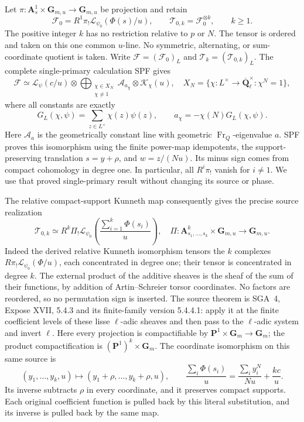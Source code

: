 Let \(\pi:\mathbf A^1_s\times\mathbf G_{m,u}\to\mathbf
G_{m,u}\) be projection and retain
\[
 \mathcal F_0=R^1\pi_!\mathcal L_{\psi_0}(\Phi(s)/u),\qquad
 \mathcal T_{0,k}=\mathcal F_0^{\otimes k},\qquad k\ge1.
 \tag{TPF.3}\label{CFStage:eq:TPF3}
\]
The positive integer \(k\) has no restriction relative to
\(p\) or \(N\). The tensor is ordered and taken on this
one common \(u\)-line. No symmetric, alternating, or
sum-coordinate quotient is taken. Write
\(\mathcal F=(\mathcal F_0)_L\) and
\(\mathcal T_k=(\mathcal T_{0,k})_L\).
The complete single-primary calculation SPF gives
\[
 \mathcal F\simeq
 \mathcal L_\psi(c/u)\otimes
 \bigoplus_{\substack{\chi\in X_N\\\chi\ne1}}
        \mathcal A_{a_\chi}\otimes\mathcal K_\chi(u),
 \quad
 X_N=\{\chi:L^\times\to\overline{\mathbf Q}_\ell^\times:
                      \chi^N=1\},
 \tag{TPF.4}\label{CFStage:eq:TPF4}
\]
where all constants are exactly
\[
 G_L(\chi,\psi)=\sum_{z\in L^\times}\chi(z)\psi(z),
 \qquad
 a_\chi=-\chi(N)G_L(\chi,\psi).
 \tag{TPF.5}\label{CFStage:eq:TPF5}
\]
Here \(\mathcal A_a\) is the geometrically constant line
with geometric \(\operatorname{Fr}_Q\)-eigenvalue \(a\).
SPF proves this isomorphism using the finite power-map
idempotents, the support-preserving translation
\(s=y+\rho\), and \(w=z/(Nu)\). Its minus sign comes from
compact cohomology in degree one. In particular, all
\(R^i\pi_!\) vanish for \(i\ne1\). We use that proved
single-primary result without changing its source or phase.

The relative compact-support Kunneth map consequently gives
the precise source realization
\[
 \mathcal T_{0,k}\simeq
 R^k\Pi_!\mathcal L_{\psi_0}
       \left(\frac{\sum_{i=1}^k\Phi(s_i)}u\right),
 \quad
 \Pi:\mathbf A^k_{s_1,\ldots,s_k}\times\mathbf G_{m,u}
          \longrightarrow\mathbf G_{m,u}.
 \tag{TPF.6}\label{CFStage:eq:TPF6}
\]
Indeed the derived relative Kunneth isomorphism tensors the
\(k\) complexes \(R\pi_!\mathcal L_{\psi_0}(\Phi/u)\),
each concentrated in degree one; their tensor is
concentrated in degree \(k\). The external product of the
additive sheaves is the sheaf of the sum of their functions,
by addition of Artin--Schreier torsor coordinates. No
factors are reordered, so no permutation sign is inserted.
The source theorem is SGA~4, Expose XVII, 5.4.3
and its finite-family version 5.4.4.1: apply it
at the finite coefficient levels of these
lisse \(\ell\)-adic sheaves and then pass to
the \(\ell\)-adic system and invert \(\ell\).
Here every projection is compactifiable by
\(\mathbf P^1\times\mathbf G_m\to\mathbf G_m\);
the product compactification is
\((\mathbf P^1)^k\times\mathbf G_m\).
The coordinate isomorphism on this same source is
\[
 (y_1,\ldots,y_k,u)\longmapsto
       (y_1+\rho,\ldots,y_k+\rho,u),\qquad
 \frac{\sum_i\Phi(s_i)}u
       =\frac{\sum_i y_i^N}{Nu}+\frac{kc}{u}.
 \tag{TPF.7}\label{CFStage:eq:TPF7}
\]
Its inverse subtracts \(\rho\) in every coordinate, and it
preserves compact supports. Each original coefficient
function is pulled back by this literal substitution,
and its inverse is pulled back by the same map.

